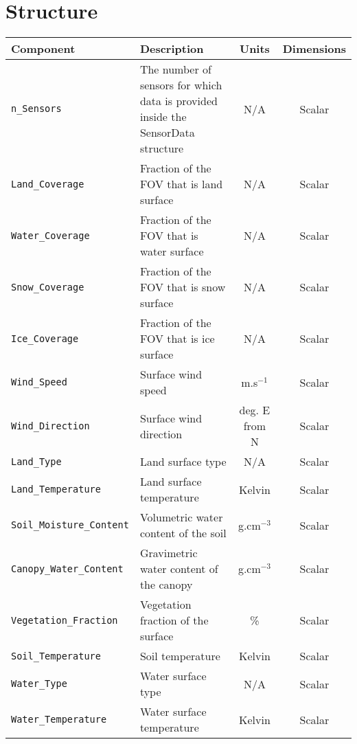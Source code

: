 \section{\Surface{} Structure}
\label{sec:surface_structure}



\begin{table}[htp]
  \centering
  \begin{tabular}{l p{7cm} c c}
    \hline
    \sffamily\textbf{Component} & \sffamily\textbf{Description} & \sffamily\textbf{Units} & \sffamily\textbf{Dimensions} \\
    \hline\hline
    \texttt{n\_Sensors} & The number of sensors for which data is provided inside the SensorData structure & N/A & Scalar \\
    \hline
    \texttt{Land\_Coverage}  & Fraction of the FOV that is land surface & N/A & Scalar \\
    \texttt{Water\_Coverage} & Fraction of the FOV that is water surface & N/A & Scalar \\
    \texttt{Snow\_Coverage}  & Fraction of the FOV that is snow surface & N/A & Scalar \\
    \texttt{Ice\_Coverage}   & Fraction of the FOV that is ice surface & N/A & Scalar \\
    \hline
    \texttt{Wind\_Speed}     & Surface wind speed & m.s$^{-1}$ & Scalar \\
    \texttt{Wind\_Direction} & Surface wind direction & deg. E from N & Scalar \\
    \hline
    \texttt{Land\_Type}              & Land surface type & N/A & Scalar \\
    \texttt{Land\_Temperature}       & Land surface temperature & Kelvin & Scalar \\
    \texttt{Soil\_Moisture\_Content} & Volumetric water content of the soil & g.cm$^{-3}$ & Scalar \\
    \texttt{Canopy\_Water\_Content}  & Gravimetric water content of the canopy & g.cm$^{-3}$ & Scalar \\
    \texttt{Vegetation\_Fraction}    & Vegetation fraction of the surface & \% & Scalar \\
    \texttt{Soil\_Temperature}       & Soil temperature & Kelvin & Scalar \\
    \hline
    \texttt{Water\_Type}        & Water surface type & N/A & Scalar \\
    \texttt{Water\_Temperature} & Water surface temperature & Kelvin & Scalar \\

\end{tabular}
\end{table}
